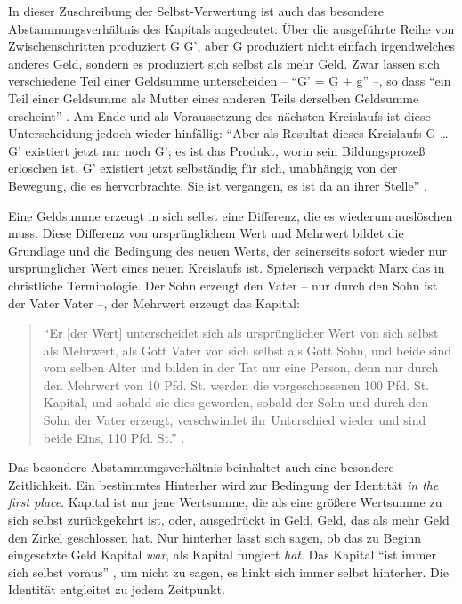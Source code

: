 \documentclass[12pt,
               paper=a4,
               twoside=false,
               onehalfspacing,
               bibliography=totoc,
               toc=graduated,
               ]{scrartcl}
\newcommand{\pc}[2]{\parencite[#1]{#2}}
\begin{document}
In dieser Zuschreibung der Selbst-Verwertung ist auch das besondere
\glq Abstammungsverhältnis\grq{} des Kapitals angedeutet: Über die
ausgeführte Reihe von Zwischenschritten \glq produziert\grq{} G G',
aber G \glq produziert\grq{} nicht einfach irgendwelches anderes Geld,
sondern es produziert sich selbst als mehr Geld. Zwar lassen sich
verschiedene Teil einer Geldsumme unterscheiden -- "`G' = G + g"'
\pc{51}{kap2} --, so dass "`ein Teil einer Geldsumme als Mutter eines
anderen Teils derselben Geldsumme erscheint"' \pc{55}{kap2}. Am Ende
und als Voraussetzung des nächsten Kreislaufs ist diese Unterscheidung
jedoch wieder hinfällig: "`Aber als Resultat dieses Kreislaufs G \dots
G' existiert jetzt nur noch G'; es ist das Produkt, worin sein
Bildungsprozeß erloschen ist. G' existiert jetzt selbständig für sich,
unabhängig von der Bewegung, die es hervorbrachte. Sie ist vergangen,
es ist da an ihrer Stelle"' \pc{49}{kap2}.

Eine Geldsumme erzeugt in sich selbst eine Differenz, die es wiederum
auslöschen muss. Diese Differenz von ursprünglichem Wert und Mehrwert
bildet die Grundlage und die Bedingung des neuen Werts, der
seinerseits sofort wieder nur \glq ursprünglicher\grq{} Wert eines
neuen Kreislaufs ist. Spielerisch verpackt Marx das in christliche
Terminologie. Der Sohn erzeugt den Vater -- nur durch den Sohn ist der
Vater Vater --, der Mehrwert erzeugt das Kapital:
%
\begin{spacing}{1}
\begin{quote}
"`Er [der Wert] unterscheidet sich als ursprünglicher
Wert von sich selbst als Mehrwert, als Gott Vater von sich selbst als
Gott Sohn, und beide sind vom selben Alter und bilden in der Tat nur
eine Person, denn nur durch den Mehrwert von 10 Pfd. St. werden die
vorgeschossenen 100 Pfd. St. Kapital, und sobald sie dies geworden,
sobald der Sohn und durch den Sohn der Vater erzeugt, verschwindet ihr
Unterschied wieder und sind beide Eins, 110 Pfd. St."' \pc{S. 169
f.}{kap}.
\end{quote}
\end{spacing}

Das besondere Abstammungsverhältnis beinhaltet auch eine besondere
Zeitlichkeit. Ein bestimmtes \glq Hinterher\grq{} wird zur Bedingung
der Identität \emph{in the first place}. Kapital ist nur jene
Wertsumme, die als eine größere Wertsumme zu sich selbst zurückgekehrt
ist, oder, ausgedrückt in Geld, Geld, das als mehr Geld den Zirkel
geschlossen hat. Nur hinterher lässt sich sagen, ob das zu Beginn
eingesetzte Geld Kapital \emph{war}, als Kapital fungiert \emph{hat}.
Das Kapital "`ist immer sich selbst voraus"' \pc{125}{strauss}, um
nicht zu sagen, es hinkt sich immer selbst hinterher. Die Identität
entgleitet zu jedem Zeitpunkt.
\end{document}
